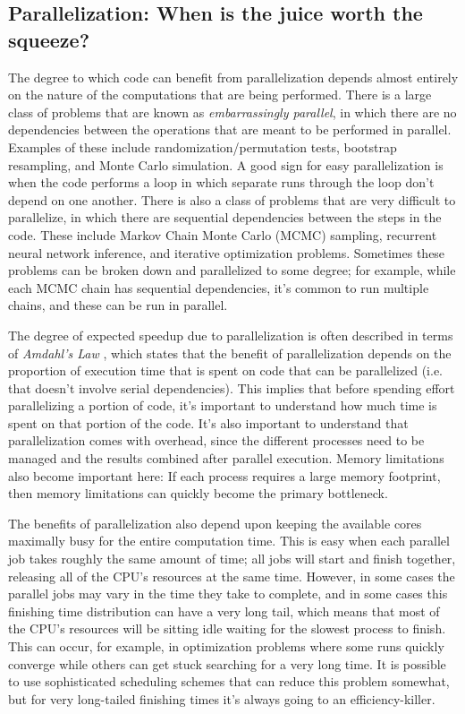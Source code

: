\subsection{Parallelization: When is the juice worth the squeeze?}

The degree to which code can benefit from parallelization depends almost entirely on the nature of the computations that are being performed.  There is a large class of problems that are known as \textit{embarrassingly parallel}, in which there are no dependencies between the operations that are meant to be performed in parallel.  Examples of these include randomization/permutation tests, bootstrap resampling, and Monte Carlo simulation.  A good sign for easy parallelization is when the code performs a loop in which separate runs through the loop don't depend on one another.  There is also a class of problems that are very difficult to parallelize, in which there are sequential dependencies between the steps in the code.  These include Markov Chain Monte Carlo (MCMC) sampling, recurrent neural network inference, and iterative optimization problems.  Sometimes these problems can be broken down and parallelized to some degree; for example, while each MCMC chain has sequential dependencies, it's common to run multiple chains, and these can be run in parallel.

The degree of expected speedup due to parallelization is often described in terms of \textit{Amdahl's Law} \citep{Amdahl:1967aa}, which states that the benefit of parallelization depends on the proportion of execution time that is spent on code that can be parallelized (i.e. that doesn't involve serial dependencies).  This implies that before spending effort parallelizing a portion of code, it's important to understand how much time is spent on that portion of the code.  It's also important to understand that parallelization comes with overhead, since the different processes need to be managed and the results combined after parallel execution.  Memory limitations also become important here: If each process requires a large memory footprint, then memory limitations can quickly become the primary bottleneck.

The benefits of parallelization also depend upon keeping the available cores maximally busy for the entire computation time.  This is easy when each parallel job takes roughly the same amount of time; all jobs will start and finish together, releasing all of the CPU's resources at the same time. However, in some cases the parallel jobs may vary in the time they take to complete, and in some cases this finishing time distribution can have a very long tail, which means that most of the CPU's resources will be sitting idle waiting for the slowest process to finish. This can occur, for example, in optimization problems where some runs quickly converge while others can get stuck searching for a very long time.  It is possible to use sophisticated scheduling schemes that can reduce this problem somewhat, but for very long-tailed finishing times it's always going to an efficiency-killer.

